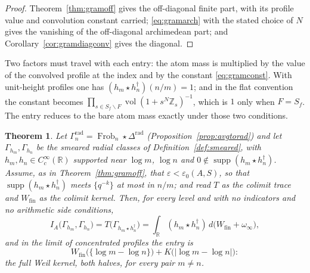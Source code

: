 \documentclass[11pt]{amsart}
\newtheorem{theorem}{Theorem}[section]
\theoremstyle{definition}
\theoremstyle{remark}
\newcommand{\R}{\mathbb R}
\newcommand{\Z}{\mathbb Z}
\newcommand{\Frob}{\operatorname{Frob}}
\newcommand{\supp}{\operatorname{supp}}
\newcommand{\vol}{\operatorname{vol}}
\newcommand{\Wfin}{W_{\mathrm{fin}}}
\begin{document}
\begin{proof}
Theorem~\ref{thm:gramoff} gives the off-diagonal finite part, with its profile
value and convolution constant carried; \eqref{eq:gramarch} with the stated
choice of $N$ gives the vanishing of the off-diagonal archimedean part; and
Corollary~\ref{cor:gramdiagconv} gives the diagonal.
\end{proof}

Two factors must travel with each entry: the atom mass is multiplied by the
value of the convolved profile at the index and by the constant
\eqref{eq:gramconst}. With unit-height profiles one has
$(h_m\star h_n^\dagger)(n/m)=1$; and in the flat convention the constant
becomes $\prod_{s\in S_f\smallsetminus F}\vol(1+s^N\Z_s)^{-1}$, which is $1$
only when $F=S_f$. The entry reduces to the bare atom mass exactly under those
two conditions.

\begin{theorem}\label{thm:fullweil}
Let $\Gamma_n^{\mathrm{rad}}=\Frob_n\star\Delta^{\mathrm{rad}}$
(Proposition~\ref{prop:avgtorad}) and let $\Gamma_{h_m},\Gamma_{h_n}$ be the
smeared radial classes of Definition~\ref{def:smeared}, with $h_m,h_n\in
C_c^\infty(\R)$ supported near $\log m$, $\log n$ and $0\notin
\supp(h_m\star h_n^\dagger)$. Assume, as in Theorem~\ref{thm:gramoff}, that
$\varepsilon<\varepsilon_0(A,S)$, so that $\supp(h_m\star h_n^\dagger)$ meets
$\{q^{-k}\}$ at most in $n/m$; and read $T$ as the colimit trace and $\Wfin$ as
the colimit kernel. Then, for \emph{every} level and with \emph{no indicators
and no arithmetic side conditions},
\begin{equation}\label{eq:radgram}
  I_A\bigl(\Gamma_{h_m},\Gamma_{h_n}\bigr)=T\bigl(\Gamma_{h_m\star h_n^\dagger}
   \bigr)=\int_\R(h_m\star h_n^\dagger)\,d\bigl(\Wfin+\omega_\infty\bigr),
\end{equation}
and in the limit of concentrated profiles the entry is
\begin{equation}\label{eq:radgramentry}
  \Wfin\bigl(\{\log m-\log n\}\bigr)+K\bigl(|\log m-\log n|\bigr):
\end{equation}
the full Weil kernel, both halves, for every pair $m\ne n$.
\end{theorem}
\end{document}
